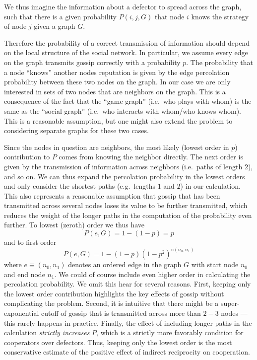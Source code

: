 \documentclass{article}
\renewcommand{\=}[1]{\stackrel{#1}{=}} %
\begin{document}
We thus imagine the information about a defector to spread across the graph, such that there is a given probability $P(i,j,G)$ that node $i$ knows the strategy of node $j$ given a graph $G$.

Therefore the probability of a correct
transmission of information should depend on the local structure of the
social network. In particular, we assume every edge on the graph transmits gossip
correctly with a probability $p$. The probability that a node ``knows''
another nodes reputation is given by the edge percolation probability
between these two nodes on the graph. In our case we are only interested
in sets of two nodes that are neighbors on the graph. This is a
consequence of the fact that the ``game graph'' (i.e.~who plays with
whom) is the same as the ``social graph'' (i.e.~who interacts with
whom/who knows whom). This is a reasonable assumption, but one might
also extend the problem to considering separate graphs for these two
cases.

Since the nodes in question are neighbors, the most likely (lowest order
in $p$) contribution to $P$ comes from knowing the neighbor directly. The next
order is given by the transmission of information across neighbors
(i.e.~paths of length $2$), and so on. We can thus expand the
percolation probability in the lowest orders and only consider the
shortest paths (e.g.~lengths $1$ and $2$) in our calculation. This also
represents a reasonable assumption that gossip that has been transmitted
across several nodes loses its value to be further transmitted, which
reduces the weight of the longer paths in the computation of the
probability even further. To lowest (zeroth) order we thus have
\[P(e,G) = 1 - (1-p) = p\]
 and to first order
\[P(e,G) = 1 - (1-p)(1-p^2)^{\text{n}(n_0,n_1)}\]
where $e \equiv (n_0,n_1)$ denotes an ordered edge in the graph $G$ with start node $n_0$
and end node $n_1$. We could of course include even higher order in calculating the percolation probability. We omit this hear for several reasons. First, keeping only the lowest order contribution highlights the key effects of gossip without complicating the problem. Second, it is intuitive that there might be a super-exponential cutoff of gossip that is transmitted across more than $2-3$ nodes --- this rarely happens in practice. Finally, the effect of including longer paths in the calculation \emph{strictly increases} $P$, which is a strictly more favorably condition for cooperators over defectors. Thus, keeping only the lowest order is the most conservative estimate of the positive effect of indirect reciprocity on cooperation.
\end{document}
